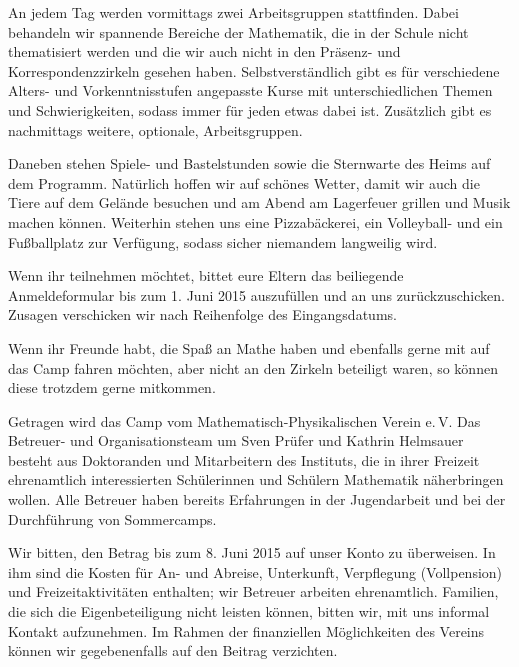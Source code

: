 \documentclass[12pt]{zettel}
\begin{document}
An jedem Tag werden vormittags zwei Arbeitsgruppen stattfinden. Dabei behandeln wir spannende
Bereiche der Mathematik, die in der Schule nicht thematisiert werden und die
wir auch nicht in den Präsenz- und Korrespondenzzirkeln gesehen haben.
Selbstverständlich gibt es für verschiedene Alters- und Vorkenntnisstufen angepasste Kurse
mit unterschiedlichen Themen und Schwierigkeiten, sodass immer für jeden
etwas dabei ist. Zusätzlich gibt es nachmittags weitere, optionale,
Arbeitsgruppen.

Daneben stehen Spiele- und Bastelstunden sowie die
Sternwarte des Heims auf dem Programm. Natürlich hoffen wir auf
schönes Wetter, damit wir auch die Tiere auf dem Gelände besuchen
und am Abend am Lagerfeuer grillen und Musik machen können.
Weiterhin stehen uns eine Pizzabäckerei, ein Volleyball- und ein
Fußballplatz zur Verfügung, sodass sicher niemandem langweilig
wird.

\vspace{\medskipamount}

\begin{minipage}{0.63\textwidth}
Wenn ihr teilnehmen möchtet, bittet eure Eltern das beiliegende Anmeldeformular
bis zum 1. Juni 2015 auszufüllen und an uns zurückzuschicken. Zusagen
verschicken wir nach Reihenfolge des Eingangsdatums.
\end{minipage}

\vspace{\medskipamount}

\begin{minipage}{0.4\textwidth}
Wenn ihr Freunde
habt, die Spaß an Mathe haben und ebenfalls gerne mit auf das
Camp fahren möchten, aber nicht an den Zirkeln beteiligt waren, so
können diese trotzdem gerne mitkommen.
\end{minipage}

\newpage

Getragen wird das Camp vom Mathematisch-Physikalischen Verein e.\,V. Das
Betreuer- und Organisationsteam um Sven Prüfer und Kathrin Helmsauer besteht
aus Doktoranden und Mitarbeitern des Instituts, die in ihrer Freizeit
ehrenamtlich interessierten Schülerinnen und Schülern Mathematik näherbringen
wollen. Alle Betreuer haben
bereits Erfahrungen in der Jugendarbeit und bei der Durch\-füh\-rung von
Sommercamps.

Wir bitten, den Betrag bis zum 8. Juni 2015 auf unser Konto zu überweisen.
In ihm sind die Kosten für An- und Abreise, Unterkunft, Verpflegung
(Vollpension) und Freizeitaktivitäten enthalten; wir Betreuer arbeiten
ehrenamtlich. Familien, die sich die Eigenbeteiligung nicht leisten können, bitten
wir, mit uns informal Kontakt aufzunehmen. Im Rahmen der finanziellen Möglichkeiten des
Vereins können wir gegebenenfalls auf den Beitrag verzichten.
\end{document}
